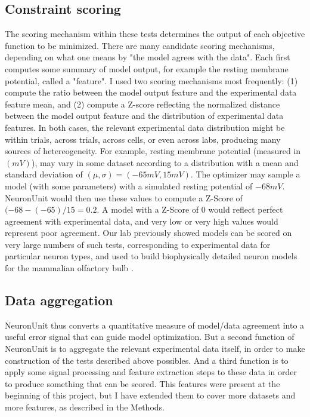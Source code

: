 \subsection{Constraint scoring}
The scoring mechanism within these tests determines the output of each objective function to be minimized.  There are many candidate scoring mechanisms, depending on what one means by "the model agrees with the data".  Each first computes some summary of model output, for example the resting membrane potential, called a "feature".
I used two scoring mechanisms most frequently: (1) compute the ratio between the model output feature and the experimental data feature mean, and (2) compute a Z-score reflecting the normalized distance between the model output feature and the distribution of experimental data features.
In both cases, the relevant experimental data distribution might be within trials, across trials, across cells, or even across labs, producing many sources of hetereogeneity.
For example, resting membrane potential (measured in $(mV)$), may vary in some dataset according to a distribution with a mean and standard deviation of $(\mu,\sigma)=(-65mV,15mV)$.
The optimizer may sample a model (with some parameters) with a simulated resting potential of $-68mV$.  
NeuronUnit would then use these values to compute a Z-Score of $(-68 - (-65)/15 = 0.2$.
A model with a Z-Score of 0 would reflect perfect agreement with experimental data, and very low or very high values would represent poor agreement.
Our lab previously showed models can be scored on very large numbers of such tests, corresponding to experimental data for particular neuron types, and used to build biophysically detailed neuron models for the mammalian olfactory bulb \cite{birgiolas2019towards}.

\subsection{Data aggregation}
NeuronUnit thus converts a quantitative measure of model/data agreement into a useful error signal that can guide model optimization.
But a second function of NeuronUnit is to aggregate the relevant experimental data itself, in order to make  construction of the tests described above possibles.
And a third function is to apply some signal processing and feature extraction steps to these data in order to produce something that can be scored.
This features were present at the beginning of this project, but I have extended them to cover more datasets and more features, as described in the Methods.


